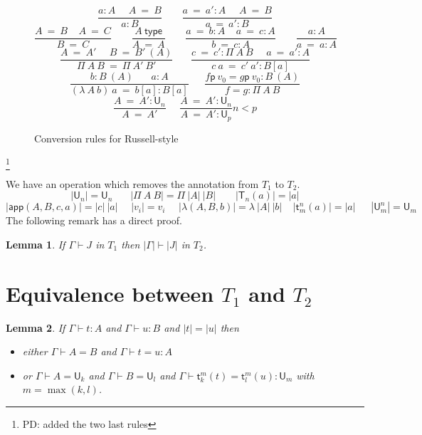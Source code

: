 \documentclass[11pt,a4paper]{article}
\newtheorem{lemma}{Lemma}[theorem]
\theoremstyle{definition}
\newcommand{\conv}{=}
\def\UU{\mathsf{U}}
\newcommand{\type}{\mathsf{type}}
\newcommand{\LAM}{\lambda}
\newcommand{\APP}{\mathsf{app}}
\newcommand{\T}{\mathsf{T}}
\newcommand{\sT}{\mathsf{t}}
\newcommand{\pp}{\mathsf{p}}
\begin{document}
\begin{figure}
  \caption{Conversion rules for Russell-style}\label{conv-Russell}
$$
\frac{ a:A~~~~~~ A~ \conv~ B}{ a:B}~~~~~~~~~
\frac{ a ~\conv~a':A~~~~~~ A  ~\conv~ B}{ a ~\conv~a':B}
$$
$$
\frac{A~=~B~~~~~A~=~C}{B~=~C}~~~~~~~~~\frac{A~\type}{A~=~A}~~~~~~~~~
\frac{a~=~b:A~~~~~a~=~c:A}{b~=~c:A}~~~~~~~~~\frac{a:A}{a~=~a:A}
$$
$$
\frac{A~=~A'~~~~~~B~=~B'~(A)}{\Pi~A~B~=~\Pi~A'~B'}~~~~~~~~
\frac{c~=~c':\Pi~A~B~~~~~~a~=~a':A}{c~a~=~c'~a':B[a]}
$$
$$
\frac{b:B~(A)~~~~~~~~ a:A}{ (\LAM~A~ b)~a  ~\conv~ b[a]:B[a]}
~~~~~~~
\frac{f\pp~v_0 = g\pp~v_0:B~(A)}{ f = g : \Pi~A~B}
$$
$$
\frac{A~=~A':\UU_n}{A~=~A'}~~~~~~
\frac{A~=~A':\UU_n}{A~=~A':\UU_p}n<p
$$
\end{figure}
\footnote{PD: added the two last rules}





\medskip

We have an operation which removes the annotation from $T_1$ to $T_2$.
$$
|\UU_n| = \UU_n~~~~~~~~|\Pi~A~B| = \Pi~|A|~|B|~~~~~~~~~|\T_n(a)| = |a|
$$
$$
|\APP(A,B,c,a)| = |c|~|a|~~~~~~|v_i| = v_i~~~~~~|\LAM(A,B,b)| = \lambda~|A|~|b|~~~~~|\sT_m^n(a)| = |a|
~~~~~~~|\UU^n_m| = \UU_m
$$
The following remark has a direct proof.

\begin{lemma}
  If $\Gamma\vdash J$ in $T_1$ then $|\Gamma|\vdash |J|$ in $T_2$.
\end{lemma}


\section{Equivalence between $T_1$ and $T_2$}



\begin{lemma}
  If $\Gamma\vdash t:A$ and $\Gamma\vdash u:B$ and $|t| = |u|$ then
  \begin{itemize}
    \item either $\Gamma\vdash A = B$
      and $\Gamma\vdash t = u:A$
    \item or $\Gamma\vdash A = \UU_k$ and $\Gamma\vdash B = \UU_l$ and $\Gamma\vdash \sT_k^m(t) = \sT_l^m(u):\UU_m$ with $m = \max(k,l)$.
  \end{itemize}
\end{lemma}
\end{document}
